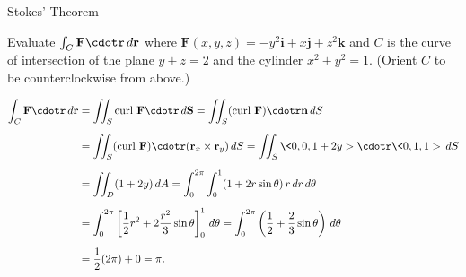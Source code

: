 \documentclass[11pt,english,
handout
]{beamer}
\begin{document}
\begin{frame}[t]{Stokes' Theorem}
\small
\begin{example}
Evaluate $\int_C\mathbf{F}\cdotr\,d\mathbf{r}$ where $\mathbf{F}(x,y,z)=-y^2\mathbf{i}+x\mathbf{j}+z^2\mathbf{k}$ and $C$ is the curve of intersection of the plane $y+z=2$ and the cylinder $x^2+y^2=1$. (Orient $C$ to be counterclockwise from above.)

{\footnotesize
\begin{align*}
\int_C\mathbf{F}\cdotr\,d\mathbf{r}&=\iint_S\text{curl }\mathbf{F}\cdotr\,d\mathbf{S}=\iint_S(\text{curl }\mathbf{F})\cdotr\mathbf{n}\,dS\\[2mm]
&=\iint_S(\text{curl }\mathbf{F})\cdotr(\mathbf{r}_x\times\mathbf{r}_y)\,dS=\iint_S\<0,0,1+2y>\cdotr\<0,1,1>\,dS\\[2mm]
&=\iint_D(1+2y)\,dA=\int_0^{2\pi}\int_0^1(1+2r\sin\theta)\,r\,dr\,d\theta\\[2mm]
&=\int_0^{2\pi}\left[\frac{1}{2}r^2+2\frac{r^2}{3}\sin\theta\right]_0^1\,d\theta=\int_0^{2\pi}\left(\frac{1}{2}+\frac{2}{3}\sin\theta\right)\,d\theta\\[2mm]
&=\frac{1}{2}(2\pi)+0=\pi.
\end{align*}}
\end{example}
\end{frame}
\end{document}
